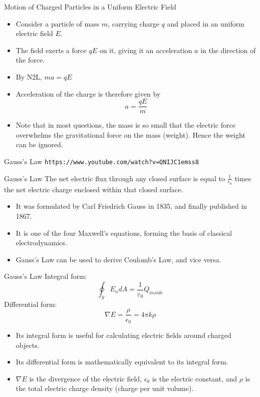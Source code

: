 \documentclass{beamer}
\begin{document}
\begin{frame}{Motion of Charged Particles in a Uniform Electric Field}{}
  \begin{itemize}
	\item Consider a particle of mass \(m\), carrying charge \(q\) and placed in an uniform electric field \(E\).
	\item The field exerts a force \(qE\) on it, giving it an acceleration \(a\) in the direction of the force.
	\item By N2L, \(ma=qE\)
	\item Acceleration of the charge is therefore given by
	\[a=\frac{qE}{m} \]
	\item Note that in most questions, the mass is so small that the electric force overwhelms the gravitational force on the mass (weight). Hence the weight can be ignored.   
  \end{itemize}
\end{frame}


\begin{frame}{Gauss's Law}{}
\texttt{https://www.youtube.com/watch?v=QNIJC1emss8}
\begin{block}{Gauss's Law}
The net electric flux through any closed surface is equal to \(\frac{1}{\epsilon_0}\) times the net electric charge enclosed within that closed surface.
\end{block}
  \begin{itemize}
  \item It was formulated by Carl Friedrich Gauss in 1835, and finally published in 1867.
  \item It is one of the four Maxwell’s equations, forming the basis of classical electrodynamics.
  \item Gauss’s Law can be used to derive Coulomb’s Law, and vice versa.
  \end{itemize}
\end{frame}

\begin{frame}{Gauss's Law}{}
Integral form:
\[\oint_S {E_n dA = \frac{1}{{\varepsilon _0 }}} Q_{inside}\]
Differential form:
\[\nabla E=\frac{\rho}{\epsilon_0}=4\pi k\rho\]
  \begin{itemize}
  \item Its integral form is useful for calculating electric fields around charged objects.
  \item Its differential form is mathematically equivalent to its integral form.
  \item \(\nabla E\) is the divergence of the electric field, \(\epsilon_0\) is the electric constant, and \(\rho\) is the total electric charge density (charge per unit volume).
  \end{itemize}
\end{frame}
\end{document}
